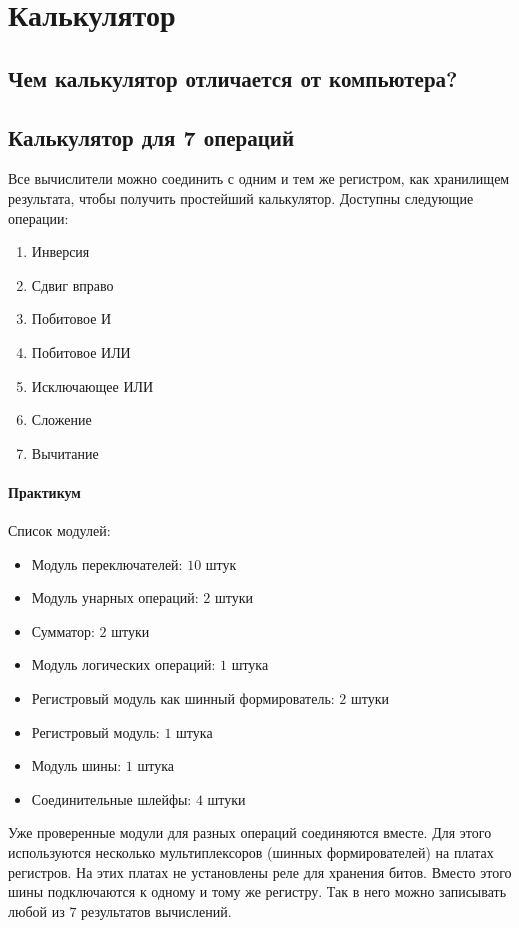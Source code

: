 \chapter{Калькулятор}

\section{Чем калькулятор отличается от компьютера?}


\section{Калькулятор для 7 операций}

Все вычислители можно соединить с одним и тем же регистром, как хранилищем результата, чтобы получить простейший
калькулятор. Доступны следующие операции:
\begin{enumerate}
    \item Инверсия
    \item Сдвиг вправо
    \item Побитовое И
    \item Побитовое ИЛИ
    \item Исключающее ИЛИ
    \item Сложение
    \item Вычитание
\end{enumerate}

\subsubsection{Практикум}

Список модулей:
\begin{itemize}
    \item Модуль переключателей: $10$ штук
    \item Модуль унарных операций: $2$ штуки
    \item Сумматор: $2$ штуки
    \item Модуль логических операций: $1$ штука
    \item Регистровый модуль как шинный формирователь: $2$ штуки
    \item Регистровый модуль: $1$ штука
    \item Модуль шины: $1$ штука
    \item Соединительные шлейфы: $4$ штуки
\end{itemize}

Уже проверенные модули для разных операций соединяются вместе.
Для этого используются несколько мультиплексоров (шинных формирователей)
на платах регистров. На этих платах не установлены реле для хранения
битов. Вместо этого шины подключаются к одному и тому же регистру.
Так в него можно записывать любой из $7$ результатов вычислений.

